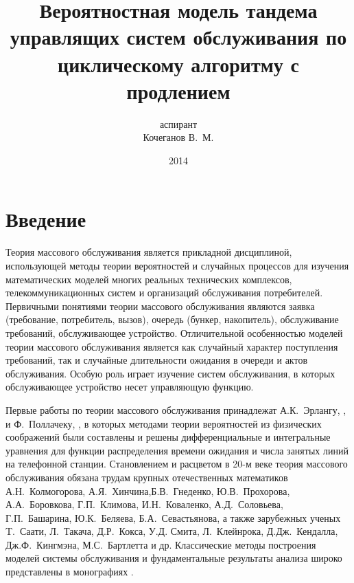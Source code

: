 \documentclass[a4paper,12pt,russian]{extarticle}
\title{Вероятностная модель тандема управлящих систем обслуживания по циклическому алгоритму с продлением}
\author{аспирант \\ Кочеганов В.~М.}
\date{2014}
\begin{document}
\tableofcontents

\setcounter{page}{2}
\section*{Введение}
Теория массового обслуживания является прикладной дисциплиной, использующей методы теории вероятностей и случайных процессов для  изучения математических моделей многих реальных технических комплексов, телекоммуникационных систем и организаций обслуживания потребителей. 
Первичными понятиями теории массового обслуживания являются заявка (требование, потребитель, вызов), очередь (бункер, накопитель), обслуживание требований, обслуживающее устройство.
Отличительной особенностью моделей теории массового обслуживания является как случайный характер поступления требований, так и случайные длительности ожидания в очереди и актов обслуживания.
Особую роль играет изучение систем обслуживания, в которых обслуживающее устройство несет управляющую функцию.

Первые работы по теории массового обслуживания принадлежат А.К.~Эрлангу, \cite{Erlang:1909, Erlang:1917}, и Ф.~Поллачеку, \cite{Pollaczek:1934}, в которых методами теории вероятностей из физических соображений были составлены и решены дифференциальные и интегральные уравнения для функции распределения времени ожидания и числа занятых линий на телефонной станции. 
Становлением и расцветом в 20-м веке теория массового обслуживания обязана трудам крупных отечественных математиков 
 А.Н.~Колмогорова, А.Я.~Хинчина,Б.В.~Гнеденко, Ю.В.~Прохорова, А.А.~Боровкова, Г.П.~Климова, И.Н.~Коваленко, А.Д.~Соловьева, Г.П.~Башарина,  Ю.К.~Беляева, Б.А.~Севастьянова,
а также зарубежных ученых T.~Саати, Л.~Такача, Д.Р.~Кокса, У.Д. Смита, Л.~Клейнрока, Д.Дж.~Кендалла, Дж.Ф.~Кингмэна,  М.С.~Бартлетта и др. 
Классические методы построения моделей системы обслуживания и фундаментальные результаты анализа широко представлены в монографиях \cite{Hinchin:2010, Klimov:1966, Gnedenko:2012, Saati:1971, Bocharov:1995, Asmussen:2008, Borovkov:1972, Borovkov:1980}.
\end{document}
